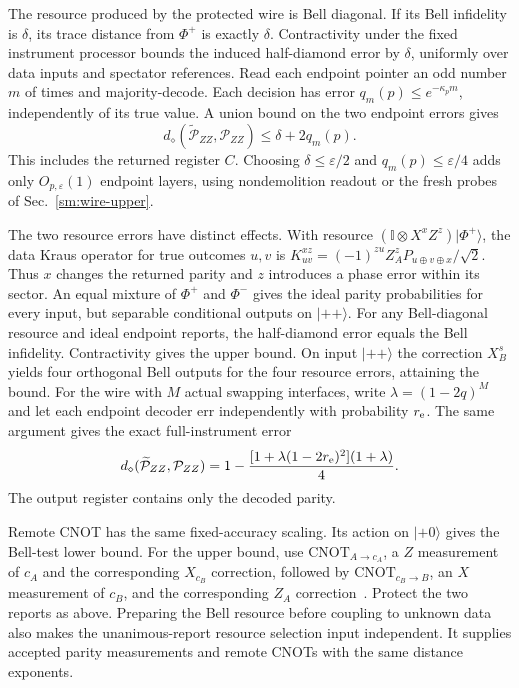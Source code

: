 \documentclass[aps,prl,twocolumn,superscriptaddress,longbibliography,reprint,floatfix]{revtex4-2}
\newcommand{\ket}[1]{\lvert #1\rangle}
\newcommand{\Id}{\mathbb I}
\newcommand{\eps}{\varepsilon}
\begin{document}
The resource produced by the protected wire is Bell diagonal. If its
Bell infidelity is $\delta$, its trace distance from $\Phi^+$ is exactly
$\delta$. Contractivity under the fixed instrument processor bounds the
induced half-diamond error by $\delta$, uniformly over data inputs and
spectator references. Read each endpoint pointer an odd number $m$ of
times and majority-decode. Each decision has error
$q_m(p)\le e^{-\kappa_p m}$, independently of its true value. A union
bound on the two endpoint errors gives
\begin{equation}
 d_\diamond(\widetilde{\mathcal P}_{ZZ},\mathcal P_{ZZ})
 \le\delta+2q_m(p).
 \label{eq:remote-parity-error}
\end{equation}
This includes the returned register $C$. Choosing $\delta\le\eps/2$ and
$q_m(p)\le\eps/4$ adds only $O_{p,\eps}(1)$ endpoint layers, using
nondemolition readout or the fresh probes of Sec.~\ref{sm:wire-upper}.

The two resource errors have distinct effects. With resource
$(\Id\otimes X^xZ^z)\ket{\Phi^+}$, the data Kraus operator for true
outcomes $u,v$ is
$K_{uv}^{xz}=(-1)^{zu}Z_A^zP_{u\oplus v\oplus x}/\sqrt2$.
Thus $x$ changes the returned parity and $z$ introduces a phase error
within its sector. An equal mixture of $\Phi^+$ and $\Phi^-$ gives the
ideal parity probabilities for every input, but separable conditional
outputs on $\ket{++}$.
For any Bell-diagonal resource and ideal endpoint reports, the
half-diamond error equals the Bell infidelity. Contractivity gives the
upper bound. On input $\ket{++}$ the correction $X_B^s$ yields four
orthogonal Bell outputs for the four resource errors, attaining the bound. For the wire with
$M$ actual swapping interfaces, write $\lambda=(1-2q)^M$ and let each
endpoint decoder err independently with probability $r_{\rm e}$. The same argument
gives the exact full-instrument error
\begin{equation}
 d_\diamond(\widetilde{\mathcal P}_{ZZ},\mathcal P_{ZZ})
 =1-\frac{[1+\lambda(1-2r_{\rm e})^2](1+\lambda)}4.
 \label{eq:parity-exact-error}
\end{equation}
The output register contains only the decoded parity.

Remote CNOT has the same fixed-accuracy scaling. Its action on
$\ket{+0}$ gives the Bell-test lower bound. For the upper bound, use
$\mathrm{CNOT}_{A\to c_A}$, a $Z$ measurement of $c_A$ and the corresponding
$X_{c_B}$ correction, followed by $\mathrm{CNOT}_{c_B\to B}$, an $X$ measurement
of $c_B$, and the corresponding $Z_A$ correction~\cite{Eisert2000}.
Protect the two reports as above. Preparing the Bell resource before
coupling to unknown data also makes the unanimous-report resource
selection input independent. It supplies accepted parity measurements
and remote CNOTs with the same distance exponents.
\end{document}
